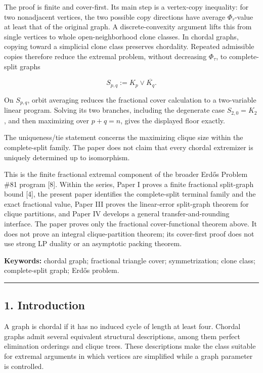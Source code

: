 \documentclass[
  american,
  11pt,
  a4paper,
]{article}
\begin{document}
The proof is finite and cover-first. Its main step is a vertex-copy inequality: for two nonadjacent vertices, the two possible copy directions have average \(\Phi_\tau\)-value at least that of the original graph. A discrete-convexity argument lifts this from single vertices to whole open-neighborhood clone classes. In chordal graphs, copying toward a simplicial clone class preserves chordality. Repeated admissible copies therefore reduce the extremal problem, without decreasing \(\Phi_\tau\), to complete-split graphs

\[
S_{p,q}:=K_p\vee\overline{K_q}.
\]

On \(S_{p,q}\), orbit averaging reduces the fractional cover calculation to a two-variable linear program. Solving its two branches, including the degenerate case \(S_{2,0}=K_2\), and then maximizing over \(p+q=n\), gives the displayed floor exactly.

The uniqueness/tie statement concerns the maximizing clique size within the complete-split family. The paper does not claim that every chordal extremizer is uniquely determined up to isomorphism.

This is the finite fractional extremal component of the broader Erdős Problem \#81 program {[}8{]}. Within the series, Paper I proves a finite fractional split-graph bound {[}4{]}, the present paper identifies the complete-split terminal family and the exact fractional value, Paper III proves the linear-error split-graph theorem for clique partitions, and Paper IV develops a general transfer-and-rounding interface. The paper proves only the fractional cover-functional theorem above. It does not prove an integral clique-partition theorem; its cover-first proof does not use strong LP duality or an asymptotic packing theorem.

\textbf{Keywords:} chordal graph; fractional triangle cover; symmetrization; clone class; complete-split graph; Erdős problem.

\begin{center}\rule{0.5\linewidth}{0.5pt}\end{center}

\subsection{1. Introduction}\label{introduction}

A graph is chordal if it has no induced cycle of length at least four. Chordal graphs admit several equivalent structural descriptions, among them perfect elimination orderings and clique trees. These descriptions make the class suitable for extremal arguments in which vertices are simplified while a graph parameter is controlled.
\end{document}
